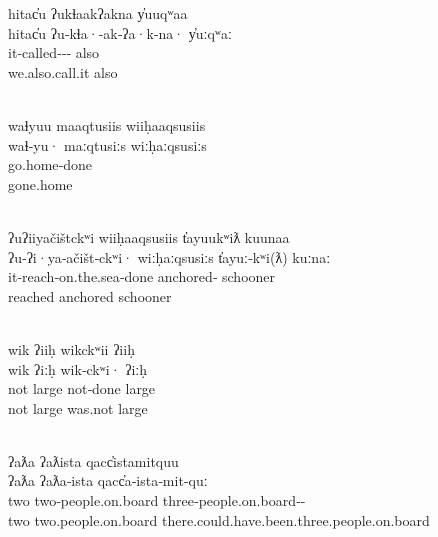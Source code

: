 \glllll hitac̓u      ʔukɬaakʔakna                          y̓uuqʷaa\\
        hitac̓u      ʔu‑kɬa·‑ak‑ʔa·k‑na·                   y̓uːqʷaː\\
           it‑called‑‑‑ also\\
           we.also.call.it                       also\\
        { }                                      \\
        \vfix

\glllll waɬyuu       maaqtusiis  wiiḥaaqsusiis\\
        waɬ‑yu·      maːqtusiːs  wiːḥaːqsusiːs\\
        go.home‑done    \\
        gone.home       \\
                { }\\
        \vfix

\glllll ʔuʔiiyačištckʷi          wiiḥaaqsusiis t̓ayuukʷiƛ         kuunaa\\
        ʔu‑ʔi·ya‑ačišt‑ckʷi·     wiːḥaːqsusiːs t̓ayuː‑kʷi(ƛ)      kuːnaː\\
        it‑reach‑on.the.sea‑done      anchored‑ schooner\\
        reached                       anchored          schooner\\
                                       \\
        \vfix

\glllll wik       ʔiiḥ      wikckʷii  ʔiiḥ\\
        wik       ʔiːḥ      wik‑ckʷi· ʔiːḥ\\
        not       large     not‑done  large\\
        not       large     was.not   large\\
           \\
        \vfix

\glllll ʔaƛa      ʔaƛista             qacc̓istamitquu\\
        ʔaƛa      ʔaƛa‑ista           qacc̓a‑ista‑mit‑quː\\
        two       two‑people.on.board three‑people.on.board‑‑\\
        two       two.people.on.board there.could.have.been.three.people.on.board\\
                     \\
        \vfix

